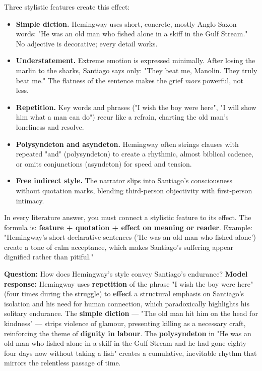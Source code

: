 \documentclass[11pt]{article}
\begin{document}
Three stylistic features create this effect:

\begin{itemize}
\item \textbf{Simple diction.} Hemingway uses short, concrete, mostly Anglo-Saxon words: "He was an old man who fished alone in a skiff in the Gulf Stream." No adjective is decorative; every detail works.
\item \textbf{Understatement.} Extreme emotion is expressed minimally. After losing the marlin to the sharks, Santiago says only: "They beat me, Manolin. They truly beat me." The flatness of the sentence makes the grief \emph{more} powerful, not less.
\item \textbf{Repetition.} Key words and phrases ("I wish the boy were here", "I will show him what a man can do") recur like a refrain, charting the old man's loneliness and resolve.
\item \textbf{Polysyndeton and asyndeton.} Hemingway often strings clauses with repeated "and" (polysyndeton) to create a rhythmic, almost biblical cadence, or omits conjunctions (asyndeton) for speed and tension.
\item \textbf{Free indirect style.} The narrator slips into Santiago's consciousness without quotation marks, blending third-person objectivity with first-person intimacy.
\end{itemize}

\begin{propriete}
In every literature answer, you must connect a stylistic feature to its effect. The formula is: \textbf{feature + quotation + effect on meaning or reader}. Example: "Hemingway's short declarative sentences ('He was an old man who fished alone') create a tone of calm acceptance, which makes Santiago's suffering appear dignified rather than pitiful."
\end{propriete}

\begin{exemplebox}
\textbf{Question:} How does Hemingway's style convey Santiago's endurance?
\textbf{Model response:} Hemingway uses \textbf{repetition} of the phrase "I wish the boy were here" (four times during the struggle) to \textbf{effect} a structural emphasis on Santiago's isolation and his need for human connection, which paradoxically highlights his solitary endurance. The \textbf{simple diction} — "The old man hit him on the head for kindness" — strips violence of glamour, presenting killing as a necessary craft, reinforcing the theme of \textbf{dignity in labour}. The \textbf{polysyndeton} in "He was an old man who fished alone in a skiff in the Gulf Stream and he had gone eighty-four days now without taking a fish" creates a cumulative, inevitable rhythm that mirrors the relentless passage of time.
\end{exemplebox}
\end{document}
